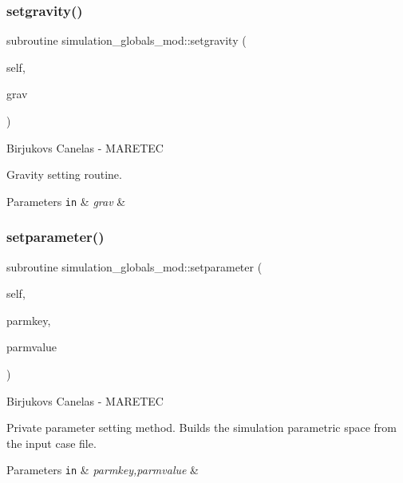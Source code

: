 \subsubsection{\texorpdfstring{setgravity()}{setgravity()}}
{\footnotesize\ttfamily subroutine simulation\+\_\+globals\+\_\+mod\+::setgravity (\begin{DoxyParamCaption}\item[{class(\hyperlink{structsimulation__globals__mod_1_1constants__t}{constants\+\_\+t}), intent(inout)}]{self,  }\item[{type(vector), intent(in)}]{grav }\end{DoxyParamCaption})\hspace{0.3cm}{\ttfamily [private]}}



Birjukovs Canelas -\/ M\+A\+R\+E\+T\+EC 

Gravity setting routine. 
\begin{DoxyParams}[1]{Parameters}
\mbox{\tt in}  & {\em grav} & \\
\hline
\end{DoxyParams}
\mbox{\label{namespacesimulation__globals__mod_a8a05831d4c3e3eb5741d65978f6fcf61}} 
\subsubsection{\texorpdfstring{setparameter()}{setparameter()}}
{\footnotesize\ttfamily subroutine simulation\+\_\+globals\+\_\+mod\+::setparameter (\begin{DoxyParamCaption}\item[{class(\hyperlink{structsimulation__globals__mod_1_1parameters__t}{parameters\+\_\+t}), intent(inout)}]{self,  }\item[{type(string), intent(in)}]{parmkey,  }\item[{type(string), intent(in)}]{parmvalue }\end{DoxyParamCaption})\hspace{0.3cm}{\ttfamily [private]}}



Birjukovs Canelas -\/ M\+A\+R\+E\+T\+EC 

Private parameter setting method. Builds the simulation parametric space from the input case file. 
\begin{DoxyParams}[1]{Parameters}
\mbox{\tt in}  & {\em parmkey,parmvalue} & \\
\hline
\end{DoxyParams}
\mbox{\label{namespacesimulation__globals__mod_a68a87c39cf88bad353e28e367a721ed4}} 

